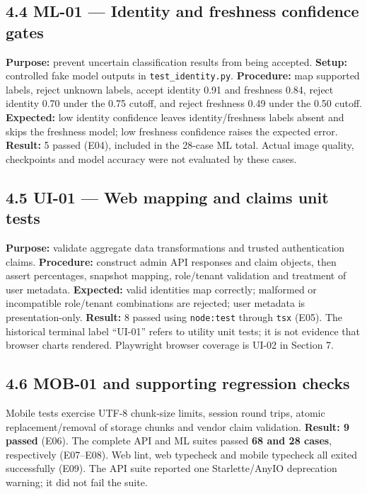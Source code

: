 \documentclass[
  11pt,
]{article}
\begin{document}
\subsection{4.4 ML-01 --- Identity and freshness confidence
gates}\label{ml-01-identity-and-freshness-confidence-gates}

\textbf{Purpose:} prevent uncertain classification results from being
accepted. \textbf{Setup:} controlled fake model outputs in
\texttt{test\_identity.py}. \textbf{Procedure:} map supported labels,
reject unknown labels, accept identity 0.91 and freshness 0.84, reject
identity 0.70 under the 0.75 cutoff, and reject freshness 0.49 under the
0.50 cutoff. \textbf{Expected:} low identity confidence leaves
identity/freshness labels absent and skips the freshness model; low
freshness confidence raises the expected error. \textbf{Result:} 5
passed (E04), included in the 28-case ML total. Actual image quality,
checkpoints and model accuracy were not evaluated by these cases.

\subsection{4.5 UI-01 --- Web mapping and claims unit
tests}\label{ui-01-web-mapping-and-claims-unit-tests}

\textbf{Purpose:} validate aggregate data transformations and trusted
authentication claims. \textbf{Procedure:} construct admin API responses
and claim objects, then assert percentages, snapshot mapping,
role/tenant validation and treatment of user metadata.
\textbf{Expected:} valid identities map correctly; malformed or
incompatible role/tenant combinations are rejected; user metadata is
presentation-only. \textbf{Result:} 8 passed using \texttt{node:test}
through \texttt{tsx} (E05). The historical terminal label ``UI-01''
refers to utility unit tests; it is not evidence that browser charts
rendered. Playwright browser coverage is UI-02 in Section 7.

\subsection{4.6 MOB-01 and supporting regression
checks}\label{mob-01-and-supporting-regression-checks}

Mobile tests exercise UTF-8 chunk-size limits, session round trips,
atomic replacement/removal of storage chunks and vendor claim
validation. \textbf{Result: 9 passed} (E06). The complete API and ML
suites passed \textbf{68 and 28 cases}, respectively (E07--E08). Web
lint, web typecheck and mobile typecheck all exited successfully (E09).
The API suite reported one Starlette/AnyIO deprecation warning; it did
not fail the suite.
\end{document}
